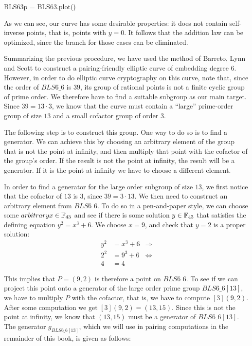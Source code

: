 \begin{sagesilent}
BLS63p = BLS63.plot()
\end{sagesilent}
\begin{center} 
\end{center}

As we can see, our curve has some desirable properties: it does not contain self-inverse points, that is, points with $y=0$. It follows that the addition law can be optimized, since the branch for those cases can be eliminated. 

Summarizing the previous procedure, we have used the method of Barreto, Lynn and Scott to construct a pairing-friendly elliptic curve of embedding degree $6$. However, in order to do elliptic curve cryptography on this curve, note that, since the order of $BLS6\_6$ is $39$, its group of rational points is not a finite cyclic group of prime order. We therefore have to find a suitable subgroup as our main target. Since $39=13\cdot 3$, we know that the curve must contain a ``large'' prime-order group of size $13$ and a small cofactor group of order $3$. 

The following step is to construct this group. One way to do so is to find a generator. We can achieve this by choosing an arbitrary element of the group that is not the point at infinity, and then multiply that point with the cofactor of the group's order. If the result is not the point at infinity, the result will be a generator. If it is the point at infinity we have to choose a different element. 

In order to find a generator for the large order subgroup of size $13$, we first notice that the cofactor of $13$ is $3$, since $39=3\cdot 13$. We then need to construct an arbitrary element from $BLS6\_6$. To do so in a pen-and-paper style, we can choose some $arbitrary x\in\mathbb{F}_{43}$ and see if there is some solution $y\in\mathbb{F}_{43}$ that satisfies the defining  equation $y^2 = x^3 + 6$. We choose $x=9$, and check that $y=2$ is a proper solution:
\begin{align*}
y^2 & = x^3 + 6 & \Rightarrow \\
2^2 & = 9^3 + 6 & \Leftrightarrow \\
4 & = 4
\end{align*}   

This implies that $P=(9,2)$ is therefore a point on $BLS6\_6$. To see if we can project this point onto a generator of the large order prime group $BLS6\_6[13]$, we have to multiply $P$ with the cofactor, that is, we have to compute $[3](9,2)$. After some computation  we get $[3](9,2) = (13,15)$. Since this is not the point at infinity, we know that $(13,15)$ must be a generator of $BLS6\_6[13]$. The generator $g_{BLS6\_6[13]}$, which we will use in pairing computations in the remainder of this book, is given as follows:

